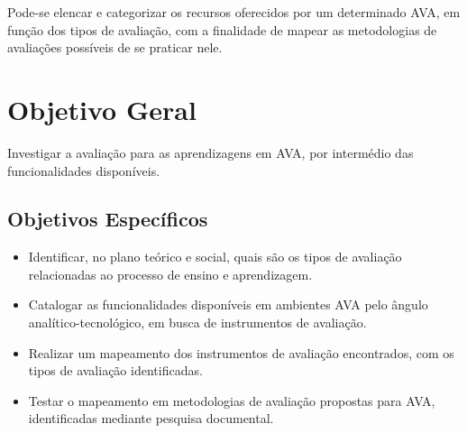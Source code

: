 Pode-se elencar e categorizar os recursos oferecidos por um determinado AVA, em função dos tipos de avaliação, com a finalidade de mapear as metodologias de avaliações possíveis de se praticar nele. 


\section{Objetivo Geral}%

Investigar a avaliação para as aprendizagens em AVA, por intermédio das funcionalidades disponíveis. 



\subsection{Objetivos Específicos}%

\begin{itemize}
	\item Identificar, no plano teórico e social, quais são os tipos de avaliação relacionadas ao processo de ensino e aprendizagem.
	\item Catalogar as funcionalidades disponíveis em ambientes AVA pelo ângulo analítico-tecnológico, em busca de instrumentos de avaliação.
	\item Realizar um mapeamento dos instrumentos de avaliação encontrados, com os tipos de avaliação identificadas.
	\item Testar o mapeamento em metodologias de avaliação propostas para AVA, identificadas mediante pesquisa documental. 
\end{itemize}

